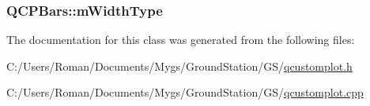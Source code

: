 \subsubsection[{m\+Width\+Type}]{ Q\+C\+P\+Bars\+::m\+Width\+Type\hspace{0.3cm}{\ttfamily [protected]}}\label{class_q_c_p_bars_a94dba1309496c7601d01e2c59715cbb3}


The documentation for this class was generated from the following files\+:\begin{DoxyCompactItemize}
\item 
C\+:/\+Users/\+Roman/\+Documents/\+Mygs/\+Ground\+Station/\+G\+S/\hyperlink{qcustomplot_8h}{qcustomplot.\+h}\item 
C\+:/\+Users/\+Roman/\+Documents/\+Mygs/\+Ground\+Station/\+G\+S/\hyperlink{qcustomplot_8cpp}{qcustomplot.\+cpp}\end{DoxyCompactItemize}
